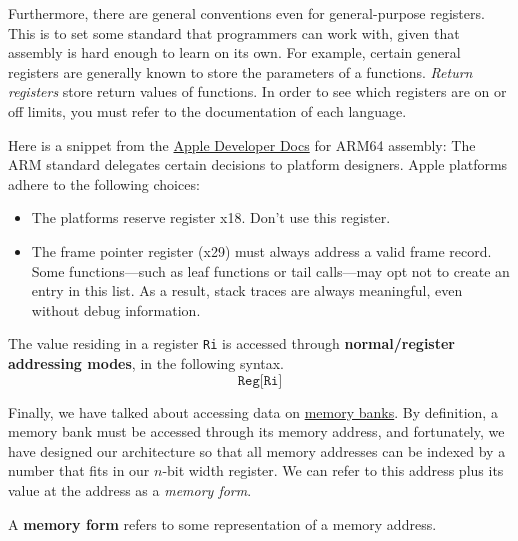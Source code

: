   Furthermore, there are general conventions even for general-purpose registers. This is to set some standard that programmers can work with, given that assembly is hard enough to learn on its own.  For example, certain general registers are generally known to store the parameters of a functions. \textit{Return registers} store return values of functions. In order to see which registers are on or off limits, you must refer to the documentation of each language. 

  \begin{example}
    \label{ex:types-of-registers}
    Here is a snippet from the \href{https://developer.apple.com/documentation/xcode/writing-arm64-code-for-apple-platforms}{Apple Developer Docs} for ARM64 assembly: The ARM standard delegates certain decisions to platform designers. Apple platforms adhere to the following choices:
    \begin{itemize}
      \item The platforms reserve register x18. Don’t use this register.
      \item The frame pointer register (x29) must always address a valid frame record. Some functions---such as leaf functions or tail calls---may opt not to create an entry in this list. As a result, stack traces are always meaningful, even without debug information.
    \end{itemize}
  \end{example}

  \begin{definition}
    \label{def:normal-register-addressing}
    The value residing in a register \texttt{Ri} is accessed through \textbf{normal/register addressing modes}, in the following syntax. 
    \begin{equation}
      \texttt{Reg[Ri]}
    \end{equation}
  \end{definition}

  Finally, we have talked about accessing data on \hyperref[def:memory-bank]{memory banks}. By definition, a memory bank must be accessed through its memory address, and fortunately, we have designed our architecture so that all memory addresses can be indexed by a number that fits in our $n$-bit width register. We can refer to this address plus its value at the address as a \textit{memory form}. 

  \begin{definition}
    \label{def:memory-form}
    A \textbf{memory form} refers to some representation of a memory address. 
  \end{definition}

